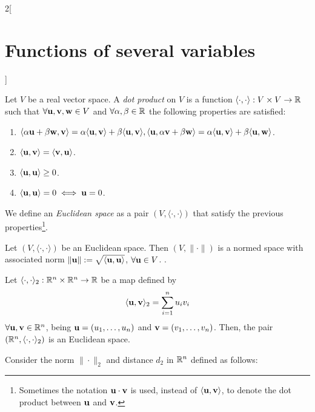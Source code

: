 \documentclass[../../../main.tex]{subfiles}
\begin{document}
\begin{multicols}{2}[\section{Functions of several variables}]
\begin{prop}
  \end{prop}
  \begin{definition}
    Let $V$ be a real vector space. A \textit{dot product} on $V$ is a function $\langle\cdot,\cdot\rangle:V\times V\rightarrow\mathbb{R} $ such that $\forall \vb{u},\vb{v},\vb{w}\in V$ and $\forall\alpha,\beta\in\mathbb{R} $ the following properties are satisfied:
    \begin{enumerate}
      \item $\langle \alpha \vb{u}+\beta \vb{w},\vb{v}\rangle=\alpha\langle \vb{u},\vb{v}\rangle+\beta\langle \vb{u},\vb{v}\rangle,\\\langle \vb{u},\alpha \vb{v}+\beta \vb{w}\rangle=\alpha\langle \vb{u},\vb{v}\rangle+\beta\langle \vb{u},\vb{w}\rangle$.
      \item $\langle \vb{u},\vb{v}\rangle=\langle \vb{v},\vb{u}\rangle$.
      \item $\langle \vb{u},\vb{u}\rangle\geq 0$.
      \item $\langle \vb{u},\vb{u}\rangle=0\iff \vb{u}=0$.
    \end{enumerate}
    We define an \textit{Euclidean space} as a pair $(V,\langle\cdot,\cdot\rangle)$ that satisfy the previous properties\footnote{Sometimes the notation $\vb{u}\cdot \vb{v}$ is used, instead of $\langle \vb{u},\vb{v}\rangle$, to denote the dot product between $\vb{u}$ and $\vb{v}$.}.
  \end{definition}
  \begin{prop}
    Let $(V,\langle\cdot,\cdot\rangle)$ be an Euclidean space. Then $(V,\|\cdot\|)$ is a normed space with associated norm $\|\vb{u}\|:=\sqrt{\langle \vb{u},\vb{u}\rangle}$, $\forall \vb{u}\in V$. .
  \end{prop}
  \begin{prop}
    Let $\langle\cdot,\cdot\rangle_2:\mathbb{R}^n\times\mathbb{R}^n\rightarrow\mathbb{R} $ be a map defined by $$\langle \vb{u},\vb{v}\rangle_2=\sum_{i=1}^nu_iv_i$$ $\forall \vb{u},\vb{v}\in \mathbb{R}^n$, being $\vb{u}=(u_1,\ldots,u_n)$ and $\vb{v}=(v_1,\ldots,v_n)$. Then, the pair $(\mathbb{R}^n,\langle\cdot,\cdot\rangle_2)$ is an Euclidean space.
  \end{prop}
  \begin{corollary}
    Consider the norm $\|\cdot\|_2$ and distance $d_2$ in $\mathbb{R}^n$ defined as follows:

\end{corollary}
\end{multicols}
\end{document}
